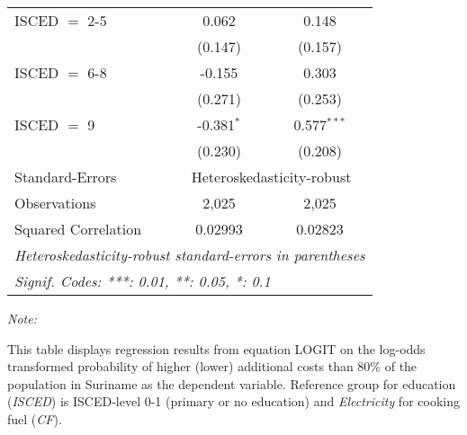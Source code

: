 \begin{table}[htbp!]
\begin{adjustbox}{width = 1\textwidth, max height = 0.95\textheight, center}
\begin{threeparttable}[b]
\begin{tabular}{lcc}
            ISCED $=$ 2-5        & 0.062          & 0.148\\   
                                 & (0.147)        & (0.157)\\   
            ISCED $=$ 6-8        & -0.155         & 0.303\\   
                                 & (0.271)        & (0.253)\\   
            ISCED $=$ 9          & -0.381$^{*}$   & 0.577$^{***}$\\   
                                 & (0.230)        & (0.208)\\   
            \midrule 
            Standard-Errors & \multicolumn{2}{c}{Heteroskedasticity-robust} \\ 
            Observations         & 2,025          & 2,025\\  
            Squared Correlation  & 0.02993        & 0.02823\\  
            \midrule \midrule
            \multicolumn{3}{l}{\emph{Heteroskedasticity-robust standard-errors in parentheses}}\\
            \multicolumn{3}{l}{\emph{Signif. Codes: ***: 0.01, **: 0.05, *: 0.1}}\\
         \end{tabular}
         
         \begin{tablenotes}\item \medskip \textit{Note:}
            \item This table displays regression results from equation LOGIT on the log-odds transformed probability of higher (lower) additional costs than 80\% of the population in Suriname as the dependent variable. Reference group for education (\textit{ISCED}) is ISCED-level 0-1 (primary or no education) and \textit{Electricity} for cooking fuel (\textit{CF}).
         \end{tablenotes}
      \end{threeparttable}
   \end{adjustbox}
\end{table}


